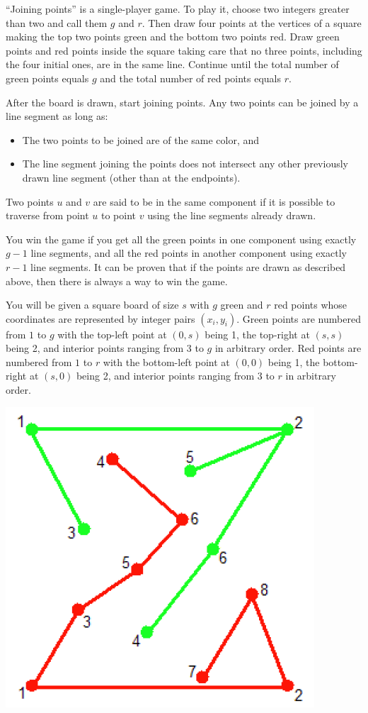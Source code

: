 ``Joining points'' is a single-player game. To play it, choose two integers greater than two and call them $g$ and $r$. Then draw four points at the vertices of a square making the top two points green and the bottom two points red. Draw green points and red points inside the square taking care that no three points, including the four initial ones, are in the same line. Continue until the total number of
green points equals $g$ and the total number of red points equals $r$.

After the board is drawn, start joining points. Any two points can be joined by a line segment as long
as:
\begin{itemize}
\item The two points to be joined are of the same color, and 
\item The line segment joining the points does not intersect any other previously drawn line segment (other than at the endpoints).
\end{itemize}

Two points $u$ and $v$ are said to be in the same component if it is possible to traverse from point $u$ to point $v$ using the line segments already drawn.

You win the game if you get all the green points in one component using exactly $g - 1$ line segments, and all the red points in another component using exactly $r - 1$ line segments. It can be proven that if the points are drawn as described above, then there is always a way to win the game.

You will be given a square board of size $s$ with $g$ green and $r$ red points whose coordinates are represented by integer pairs $(x_i, y_i)$. Green points are numbered from $1$ to $g$ with the top-left point at $(0, s)$ being 1, the top-right at $(s, s)$ being 2, and interior points ranging from $3$ to $g$ in arbitrary order.
Red points are numbered from $1$ to $r$ with the bottom-left point at $(0, 0)$ being 1, the bottom-right at $(s, 0)$ being 2, and interior points ranging from $3$ to $r$ in arbitrary order.

\includegraphics{points.png}

